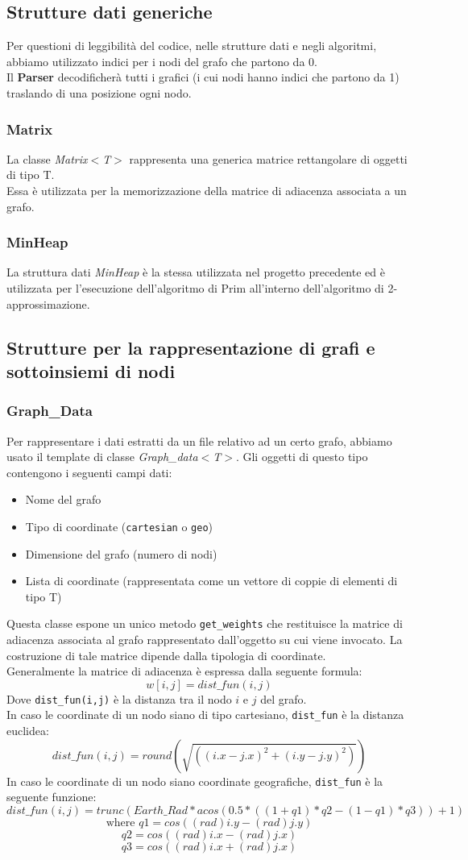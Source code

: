 \documentclass[]{article}
\begin{document}
\subsection{Strutture dati generiche}
Per questioni di leggibilità del codice, nelle strutture dati e negli algoritmi, abbiamo utilizzato indici per i nodi del grafo che partono da 0.\\
Il \textbf{Parser} decodificherà tutti i grafici (i cui nodi hanno indici che partono da 1) traslando di una posizione ogni nodo.
\subsubsection{Matrix}
La classe \textit{Matrix$<$T$>$} rappresenta una generica matrice rettangolare di oggetti di tipo T.\\
Essa è utilizzata per la memorizzazione della matrice di adiacenza associata a un grafo.
\subsubsection{MinHeap}
La struttura dati \textit{MinHeap} è la stessa utilizzata nel progetto precedente ed è utilizzata per l'esecuzione dell'algoritmo di Prim all'interno dell'algoritmo di 2-approssimazione.
\subsection{Strutture per la rappresentazione di grafi e sottoinsiemi di nodi}
\subsubsection{Graph\_Data}
Per rappresentare i dati estratti da un file relativo ad un certo grafo, abbiamo usato il template di classe \textit{Graph\_data$<$T$>$}. Gli oggetti di questo tipo contengono i seguenti campi dati:
\begin{itemize}
	\item Nome del grafo
	\item Tipo di coordinate (\verb|cartesian| o \verb|geo|)
	\item Dimensione del grafo (numero di nodi)
	\item Lista di coordinate (rappresentata come un vettore di coppie di elementi di tipo T)
\end{itemize}
Questa classe espone un unico metodo \verb|get_weights| che restituisce la matrice di adiacenza associata al grafo rappresentato dall'oggetto su cui viene invocato. La costruzione di tale matrice dipende dalla tipologia di coordinate.\\
Generalmente la matrice di adiacenza è espressa dalla seguente formula:
$$w[i,j]=dist\_fun(i, j)$$
Dove \verb|dist_fun(i,j)| è la distanza tra il nodo $i$ e $j$ del grafo.\\
In caso le coordinate di un nodo siano di tipo cartesiano, \verb|dist_fun| è la distanza euclidea:
$$dist\_fun(i,j)=round(\sqrt{((i.x - j.x)^2 + (i.y - j.y)^2)})$$
In caso le coordinate di un nodo siano coordinate geografiche, \verb|dist_fun| è la seguente funzione:
$$dist\_fun(i,j) = trunc(Earth\_Rad * acos(0.5*((1+q1)*q2-(1-q1)*q3))+1)$$
$$\text{where } q1 = cos((rad)i.y - (rad)j.y)$$
$$q2 = cos((rad)i.x - (rad)j.x)$$
$$q3 = cos((rad)i.x + (rad)j.x)$$
\end{document}
